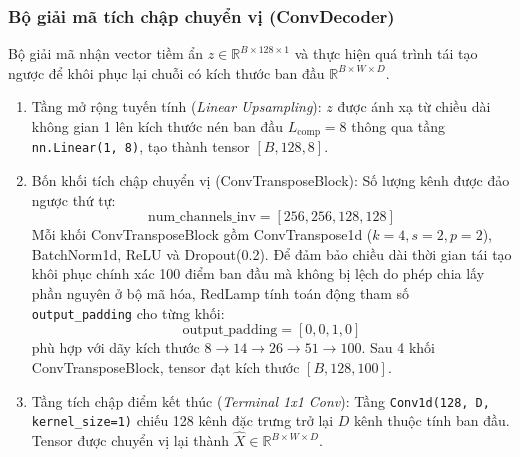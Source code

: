 \documentclass[11pt,journal,onecolumn]{IEEEtran}
\begin{document}
\subsubsection{Bộ giải mã tích chập chuyển vị (ConvDecoder)}
Bộ giải mã nhận vector tiềm ẩn $z \in \mathbb{R}^{B \times 128 \times 1}$ và thực hiện quá trình tái tạo ngược để khôi phục lại chuỗi có kích thước ban đầu $\mathbb{R}^{B \times W \times D}$.
\begin{enumerate}
    \item Tầng mở rộng tuyến tính (\textit{Linear Upsampling}): $z$ được ánh xạ từ chiều dài không gian 1 lên kích thước nén ban đầu $L_{\text{comp}} = 8$ thông qua tầng \texttt{nn.Linear(1, 8)}, tạo thành tensor $[B, 128, 8]$.
    \item Bốn khối tích chập chuyển vị (ConvTransposeBlock): Số lượng kênh được đảo ngược thứ tự:
    \begin{equation}
    \text{num\_channels\_inv} = [256, 256, 128, 128]
    \end{equation}
    Mỗi khối ConvTransposeBlock gồm ConvTranspose1d ($k=4, s=2, p=2$), BatchNorm1d, ReLU và Dropout(0.2). Để đảm bảo chiều dài thời gian tái tạo khôi phục chính xác 100 điểm ban đầu mà không bị lệch do phép chia lấy phần nguyên ở bộ mã hóa, RedLamp tính toán động tham số \texttt{output\_padding} cho từng khối:
    \begin{equation}
    \text{output\_padding} = [0, 0, 1, 0]
    \end{equation}
    phù hợp với dãy kích thước $8 \rightarrow 14 \rightarrow 26 \rightarrow 51 \rightarrow 100$.
    Sau 4 khối ConvTransposeBlock, tensor đạt kích thước $[B, 128, 100]$.
    \item Tầng tích chập điểm kết thúc (\textit{Terminal 1x1 Conv}): Tầng \texttt{Conv1d(128, D, kernel\_size=1)} chiếu 128 kênh đặc trưng trở lại $D$ kênh thuộc tính ban đầu. Tensor được chuyển vị lại thành $\hat{X} \in \mathbb{R}^{B \times W \times D}$.
\end{enumerate}
\end{document}
